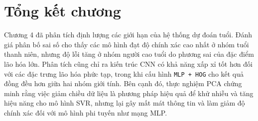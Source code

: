 \section{Tổng kết chương}
Chương 4 đã phân tích định lượng các giới hạn của hệ thống dự đoán tuổi. Đánh giá phân bố sai số cho thấy các mô hình đạt độ chính xác cao nhất ở nhóm tuổi thanh niên, nhưng độ lỗi tăng ở nhóm người cao tuổi do phương sai của đặc điểm lão hóa lớn. Phân tích cũng chỉ ra kiến trúc CNN có khả năng xấp xỉ tốt hơn đối với các đặc trưng lão hóa phức tạp, trong khi cấu hình \texttt{MLP + HOG} cho kết quả đồng đều hơn giữa hai nhóm giới tính. Bên cạnh đó, thực nghiệm PCA chứng minh rằng việc giảm chiều dữ liệu là phương pháp hiệu quả để khử nhiễu và tăng hiệu năng cho mô hình SVR, nhưng lại gây mất mát thông tin và làm giảm độ chính xác đối với mô hình phi tuyến như mạng MLP.
